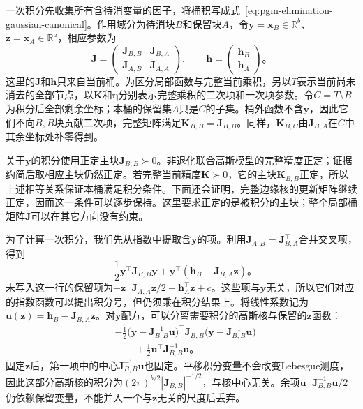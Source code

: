 一次积分先收集所有含待消变量的因子，将桶积写成式~\eqref{eq:pgm-elimination-gaussian-canonical}。作用域分为待消块$B$和保留块$A$，令$\bm{y}=\bm{x}_B\in\mathbb{R}^{b}$、$\bm{z}=\bm{x}_A\in\mathbb{R}^{a}$，相应参数为
\[
  \bm{J}=
  \begin{pmatrix}
    \bm{J}_{B,B}&\bm{J}_{B,A}\\
    \bm{J}_{A,B}&\bm{J}_{A,A}
  \end{pmatrix},
  \qquad
  \bm{h}=
  \begin{pmatrix}\bm{h}_B\\\bm{h}_A\end{pmatrix}
  \text{。}
\]
这里的$\bm{J}$和$\bm{h}$只来自当前桶。为区分局部函数与完整当前乘积，另以$T$表示当前尚未消去的全部节点，以$\bm{K}$和$\bm{\eta}$分别表示完整乘积的二次项和一次项参数。令$C=T\setminus B$为积分后全部剩余坐标；本桶的保留集$A$只是$C$的子集。桶外函数不含$\bm{y}$，因此它们不向$B,B$块贡献二次项，完整矩阵满足$\bm{K}_{B,B}=\bm{J}_{B,B}$。同样，$\bm{K}_{B,C}$由$\bm{J}_{B,A}$在$C$中其余坐标处补零得到。

关于$\bm{y}$的积分使用正定主块$\bm{J}_{B,B}\succ0$。非退化联合高斯模型的完整精度正定；证据约简后取相应主块仍然正定。若完整当前精度$\bm{K}\succ0$，它的主块$\bm{K}_{B,B}$正定，所以上述相等关系保证本桶满足积分条件。下面还会证明，完整边缘核的更新矩阵继续正定，因而这一条件可以逐步保持。这里要求正定的是被积分的主块；整个局部桶矩阵$\bm{J}$可以在其它方向没有约束。

为了计算一次积分，我们先从指数中提取含$\bm{y}$的项。利用$\bm{J}_{A,B}=\bm{J}_{B,A}^{\top}$合并交叉项，得到
\[
  -\frac12\bm{y}^{\top}\bm{J}_{B,B}\bm{y}
  +\bm{y}^{\top}(\bm{h}_B-\bm{J}_{B,A}\bm{z})
  \text{。}
\]
未写入这一行的保留项为$-\bm{z}^{\top}\bm{J}_{A,A}\bm{z}/2+\bm{h}_A^{\top}\bm{z}+c$。这些项与$\bm{y}$无关，所以它们对应的指数函数可以提出积分号，但仍须乘在积分结果上。将线性系数记为$\bm{u}(\bm{z})=\bm{h}_B-\bm{J}_{B,A}\bm{z}$。对$\bm{y}$配方，可以分离需要积分的高斯核与保留的$\bm{z}$函数：
\begin{equation}
  \begin{aligned}
    &-\frac12
      \bigl(\bm{y}-\bm{J}_{B,B}^{-1}\bm{u}\bigr)^{\top}
      \bm{J}_{B,B}
      \bigl(\bm{y}-\bm{J}_{B,B}^{-1}\bm{u}\bigr)\\
    &\hspace{2em}
      +\frac12\bm{u}^{\top}\bm{J}_{B,B}^{-1}\bm{u}
      \text{。}
  \end{aligned}
  \label{eq:pgm-elimination-complete-square}
\end{equation}
固定$\bm{z}$后，第一项中的中心$\bm{J}_{B,B}^{-1}\bm{u}$也固定。平移积分变量不会改变Lebesgue测度，因此这部分高斯核的积分为$(2\pi)^{b/2}|\bm{J}_{B,B}|^{-1/2}$，与核中心无关。余项$\bm{u}^{\top}\bm{J}_{B,B}^{-1}\bm{u}/2$仍依赖保留变量，不能并入一个与$\bm{z}$无关的尺度后丢弃。

